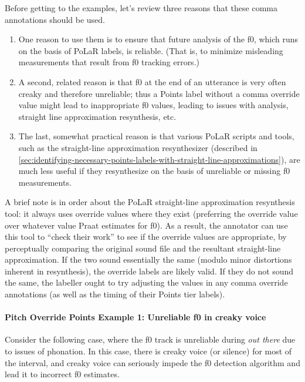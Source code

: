 \documentclass[11pt, twoside]{memoir}
\def\langtext#1{\textit{#1}}
\def\langtextquot#1{\langtext{#1}}
\begin{document}
Before getting to the examples, let’s review three reasons that these comma annotations should be used.
\begin{enumerate}
	\item One reason to use them is to ensure that future analysis of the f0, which runs on the basis of PoLaR labels, is reliable. (That is, to minimize misleading measurements that result from f0 tracking errors.)
	\item A second, related reason is that f0 at the end of an utterance is very often creaky and therefore unreliable; thus a Points label without a comma override value might lead to inappropriate f0 values, leading to issues with analysis, straight line approximation resynthesis, etc.
	\item The last, somewhat practical  reason is that various PoLaR scripts and tools, such as the straight-line approximation resynthesizer (described in \ref{sec:identifying-necessary-points-labels-with-straight-line-approximations}), are much less useful if they resynthesize on the basis of unreliable or missing f0 measurements.
\end{enumerate}

A brief note is in order about the PoLaR straight-line approximation resynthesis tool: it always uses override values where they exist (preferring the override value over whatever value Praat estimates for f0). As a result, the annotator can use this tool to “check their work” to see if the override values are appropriate, by perceptually comparing the original sound file and the resultant straight-line approximation. If the two sound essentially the same (modulo minor distortions inherent in resynthesis), the override labels are likely valid. If they do not sound the same, the labeller ought to try adjusting the values in any comma override annotations (as well as the timing of their Points tier labels).

\paragraph{Pitch Override Points Example 1: Unreliable f0 in creaky voice\label{pitch-override-points-example-1}}

Consider the following case, where the f0 track is unreliable during \langtextquot{out there} due to issues of phonation. In this case, there is creaky voice (or silence) for most of the interval, and creaky voice can seriously impede the f0 detection algorithm and lead it to incorrect f0 estimates.
\end{document}
